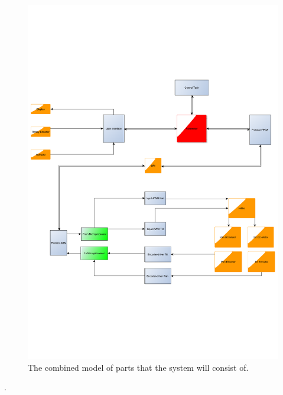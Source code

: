 \begin{figure}[htb]
	\centering
	\includegraphics[width=\textwidth,clip,trim=0 160 0 160]{graphics/Project4GreaterPresentation4.pdf} %
	\caption{The combined model of parts that the system will consist of. }
	\label{fig:completesystem}			%
\end{figure}
.